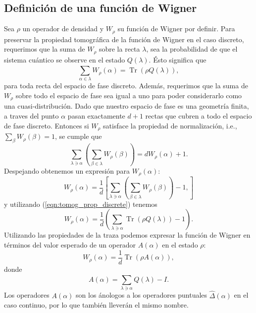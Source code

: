 \documentclass[a4paper]{report}
\DeclareMathOperator{\Tr}{Tr}
\begin{document}
  \subsection{Definición de una función de Wigner}

  Sea $\rho$ un operador de densidad y $W_\rho$ su función
  de Wigner por definir. Para preservar la propiedad
  tomográfica de la función de Wigner en el caso discreto,
  requerimos que la suma de $W_\rho$ sobre la recta
  $\lambda$, sea la probabilidad de que el sistema cuántico
  se observe en el estado $Q(\lambda)$. Ésto significa que 
  \begin{equation}
    \label{eqn:tomog_prop_discrete}
    \sum_{\alpha \in \lambda}^{} W_\rho(\alpha)
    = \Tr\left( \rho Q(\lambda) \right),
  \end{equation}
  para toda recta del espacio de fase discreto. Además,
  requerimos que la suma de $W_\rho$ sobre todo el espacio
  de fase sea igual a uno para poder considerarlo como una
  cuasi-distribución. Dado que nuestro espacio de fase es
  una geometría finita, a traves del punto $\alpha$ pasan
  exactamente $d+1$ rectas que cubren a todo el espacio de
  fase discreto.  Entonces si $W_\rho$ satisface la
  propiedad de normalización, i.e., $\sum_\beta
  W_\rho(\beta) = 1$, se cumple que
  \begin{equation}
    \sum_{\lambda \ni \alpha}^{}
    \left( \sum_{\beta \in \lambda}^{} W_\rho(\beta) \right) 
    = d W_\rho(\alpha) + 1.
  \end{equation}
  Despejando obtenemos un expresión para $W_\rho(\alpha)$:
  \[
    W_\rho(\alpha)
    = \frac{1}{d}
    \left[
      \sum_{\lambda \ni \alpha}^{}
      \left(
        \sum_{\beta \in \lambda}^{} W_\rho(\beta)
      \right) - 1,
    \right]
  \] 
  y utilizando (\ref{eqn:tomog_prop_discrete}) tenemos
  \begin{equation}
    W_\rho(\alpha)
    = \frac{1}{d} \left( \sum_{\lambda \ni \alpha}^{}
    \Tr\left( \rho Q(\lambda) \right) - 1 \right).
  \end{equation}
  Utilizando las propiedades de la traza podemos expresar
  la función de Wigner en términos del valor esperado de un
  operador $A(\alpha)$ en el estado $\rho$:
  \begin{equation}
    \label{eqn:discrete_wigner}
    W_\rho(\alpha)
    = \frac{1}{d} \Tr\left( \rho A(\alpha) \right),
  \end{equation} 
  donde 
  \begin{equation}
    \label{eqn:discrete_point_op}
    A(\alpha)
    = \sum_{\lambda \ni \alpha}^{} Q(\lambda) - I.
  \end{equation} 
  Los operadores $A(\alpha)$ son los ánologos a los
  operadores puntuales $\hat \Delta(\alpha)$ en el caso
  continuo, por lo que también lleverán el mismo nombre.
\end{document}
